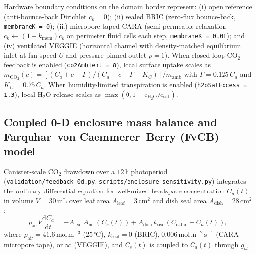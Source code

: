 \documentclass[preprint,11pt,numbers,sort&compress]{elsarticle}
\newcommand{\molms}{\ensuremath{\mathrm{mol\,m^{-2}\,s^{-1}}}}
\begin{document}
Hardware boundary conditions on the domain border represent: (i) open reference (anti-bounce-back Dirichlet $c_k = 0$); (ii) sealed BRIC (zero-flux bounce-back, \texttt{membraneK = 0}); (iii) micropore-taped CARA (semi-permeable relaxation $c_k \leftarrow (1 - k_{\mathrm{mem}})c_k$ on perimeter fluid cells each step, \texttt{membraneK = 0.01}); and (iv) ventilated VEGGIE (horizontal channel with density-matched equilibrium inlet at fan speed $U$ and pressure-pinned outlet $\rho = 1$). When closed-loop $\mathrm{CO_2}$ feedback is enabled (\texttt{co2Ambient = 8}), local surface uptake scales as $m_{\mathrm{CO_2}}(c) = [(C_a + c - \Gamma)/(C_a + c - \Gamma + K_C)] / m_{\mathrm{amb}}$ with $\Gamma = 0.125\,C_a$ and $K_C = 0.75\,C_a$. When humidity-limited transpiration is enabled (\texttt{h2oSatExcess = 1.3}), local $\mathrm{H_2O}$ release scales as $\max(0, 1 - c_{\mathrm{H_2O}}/c_{\mathrm{sat}})$.

\subsection{Coupled 0-D enclosure mass balance and Farquhar--von Caemmerer--Berry (FvCB) model}

Canister-scale $\mathrm{CO_2}$ drawdown over a $12\,\mathrm{h}$ photoperiod (\texttt{validation/feedback\_0d.py}, \texttt{scripts/enclosure\_sensitivity.py}) integrates the ordinary differential equation for well-mixed headspace concentration $C_a(t)$ in volume $V = 30\,\mathrm{mL}$ over leaf area $A_{\text{leaf}} = 3\,\mathrm{cm^2}$ and dish seal area $A_{\text{dish}} = 28\,\mathrm{cm^2}$:
\begin{equation}
\rho_{\mathrm{air}}V\frac{\mathrm{d}C_a}{\mathrm{d}t} = -A_{\text{leaf}}\,A_{\mathrm{net}}(C_s(t)) + A_{\text{dish}}\,k_{\mathrm{seal}}\left(C_{\mathrm{cabin}} - C_a(t)\right),
\label{eq:0d_mass_balance}
\end{equation}
where $\rho_{\mathrm{air}} = 41.6\,\mathrm{mol\,m^{-3}}$ ($25\,^\circ\mathrm{C}$), $k_{\mathrm{seal}} = 0$ (BRIC), $0.006\,\molms$ (CARA micropore tape), or $\infty$ (VEGGIE), and $C_s(t)$ is coupled to $C_a(t)$ through $g_{bl}$.
\end{document}
